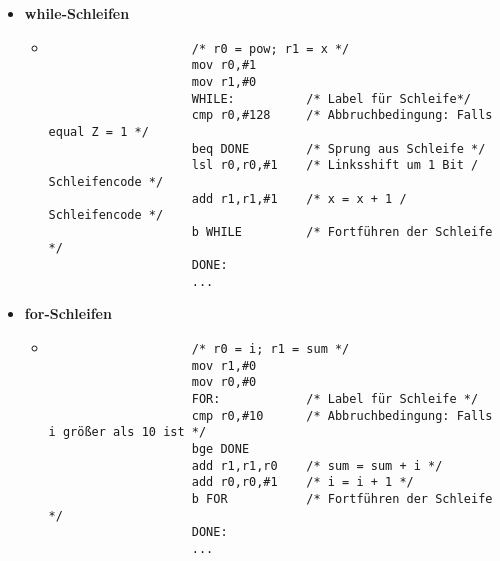 \begin{itemize}
        \item \textbf{while-Schleifen}
            \begin{itemize}
                \item[]
                    \begin{verbatim}
                    /* r0 = pow; r1 = x */
                    mov r0,#1
                    mov r1,#0
                    WHILE:          /* Label für Schleife*/
                    cmp r0,#128     /* Abbruchbedingung: Falls equal Z = 1 */
                    beq DONE        /* Sprung aus Schleife */   
                    lsl r0,r0,#1    /* Linksshift um 1 Bit / Schleifencode */
                    add r1,r1,#1    /* x = x + 1 / Schleifencode */
                    b WHILE         /* Fortführen der Schleife */
                    DONE:
                    ...
                    \end{verbatim}
            \end{itemize}

        \item \textbf{for-Schleifen}
            \begin{itemize}
                \item[]
                    \begin{verbatim}
                    /* r0 = i; r1 = sum */
                    mov r1,#0
                    mov r0,#0
                    FOR:            /* Label für Schleife */
                    cmp r0,#10      /* Abbruchbedingung: Falls i größer als 10 ist */
                    bge DONE 
                    add r1,r1,r0    /* sum = sum + i */
                    add r0,r0,#1    /* i = i + 1 */
                    b FOR           /* Fortführen der Schleife */
                    DONE:
                    ...
                    \end{verbatim}
            \end{itemize}
    \end{itemize}

\pagebreak

